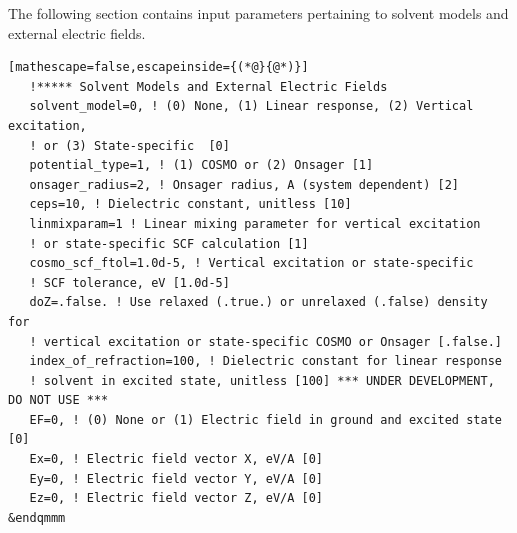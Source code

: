 \documentclass[letterpaper,12pt,titlepage]{article}
\begin{document}
The following section contains input parameters pertaining to solvent models and external electric fields.
\begin{lstlisting}[mathescape=false,escapeinside={(*@}{@*)}]
   !***** Solvent Models and External Electric Fields
   solvent_model=0, ! (0) None, (1) Linear response, (2) Vertical excitation, 
   ! or (3) State-specific  [0]
   potential_type=1, ! (1) COSMO or (2) Onsager [1]
   onsager_radius=2, ! Onsager radius, A (system dependent) [2]
   ceps=10, ! Dielectric constant, unitless [10]
   linmixparam=1 ! Linear mixing parameter for vertical excitation 
   ! or state-specific SCF calculation [1]
   cosmo_scf_ftol=1.0d-5, ! Vertical excitation or state-specific 
   ! SCF tolerance, eV [1.0d-5]
   doZ=.false. ! Use relaxed (.true.) or unrelaxed (.false) density for 
   ! vertical excitation or state-specific COSMO or Onsager [.false.]
   index_of_refraction=100, ! Dielectric constant for linear response 
   ! solvent in excited state, unitless [100] *** UNDER DEVELOPMENT, DO NOT USE ***
   EF=0, ! (0) None or (1) Electric field in ground and excited state [0]
   Ex=0, ! Electric field vector X, eV/A [0]
   Ey=0, ! Electric field vector Y, eV/A [0]
   Ez=0, ! Electric field vector Z, eV/A [0] 
&endqmmm
\end{lstlisting}
\end{document}
